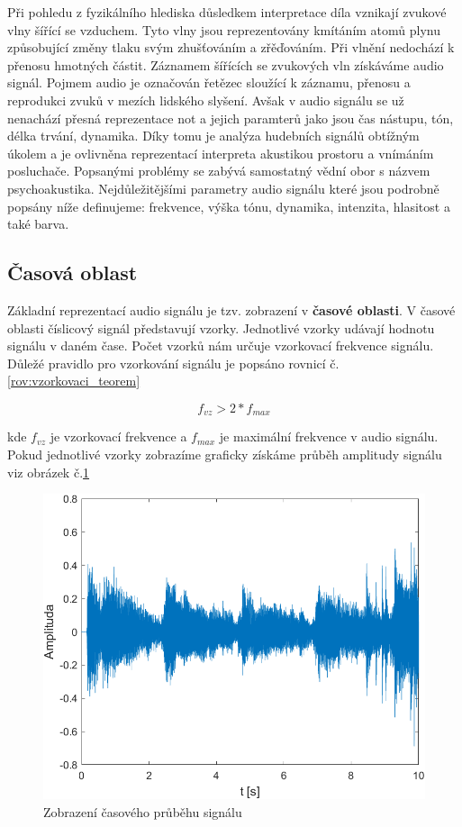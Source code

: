   Při pohledu z fyzikálního hlediska důsledkem interpretace díla vznikají zvukové vlny šířící se vzduchem.
  Tyto vlny jsou reprezentovány kmítáním atomů plynu způsobující změny tlaku svým zhušťováním a zřěďováním. Při vlnění nedochází k přenosu hmotných částit.
  Záznamem šířících se zvukových vln získáváme audio signál.
  Pojmem audio je označován řetězec sloužící k záznamu, přenosu a reprodukci zvuků v mezích lidského slyšení. 
  Avšak v audio signálu se už nenachází přesná reprezentace not a jejich paramterů jako jsou čas nástupu, tón, délka trvání, dynamika.
  Díky tomu je analýza hudebních signálů obtížným úkolem a je ovlivněna reprezentací interpreta akustikou prostoru a vnímáním posluchače.
  Popsanými problémy se zabývá samostatný vědní obor s názvem psychoakustika.
  Nejdůležitějšími parametry audio signálu které jsou podrobně popsány níže definujeme: frekvence, výška tónu, dynamika, intenzita, hlasitost a také barva.


  \subsection{Časová oblast}
  Základní reprezentací audio signálu je tzv. zobrazení v \textbf{časové oblasti}.
  V časové oblasti číslicový signál představují vzorky. Jednotlivé vzorky udávají hodnotu signálu v daném čase.
  Počet vzorků nám určuje vzorkovací frekvence signálu. Důležé pravidlo pro vzorkování signálu je popsáno rovnicí č. \ref*{rov:vzorkovaci_teorem}
  
  \begin{equation}
    f_{vz} > 2 * f_{max}
    \label{rov:vzorkovaci_teorem}
  \end{equation}

  kde $f_{vz}$ je vzorkovací frekvence a $f_{max}$ je maximální frekvence v audio signálu.  
  Pokud jednotlivé vzorky zobrazíme graficky získáme průběh amplitudy signálu viz obrázek č.\ref*{fig:Waveform}

  \begin{figure}[H]
    \centering
    \includegraphics[width = 0.8\linewidth]{obrazky/Waveform.png}
    \caption{Zobrazení časového průběhu signálu}
    \label{fig:Waveform}
  \end{figure}

